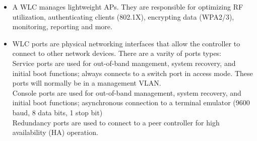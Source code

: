 \documentclass{article}
\begin{document}
\begin{itemize}
  	\item[] A WLC manages lightweight APs. They are responsible for optimizing RF utilization, authenticating clients (802.1X), encrypting data (WPA2/3), monitoring, reporting and more.\\
  	\item[] WLC ports are physical networking interfaces that allow the controller to connect to other network devices. There are a varity of ports types:\\
  	
		Service ports are used for out-of-band mangement, system recovery, and initial boot functions; always connects to a switch port in access mode. These ports will normally be in a management VLAN.\\
		
		Console ports are used for out-of-band management, system recovery, and initial boot functions; asynchronous connection to a terminal emulator (9600 baud, 8 data bits, 1 stop bit)\\
		
		Redundancy ports are used to connect to a peer controller for high availability (HA) operation.\\
		

\end{itemize}
\end{document}
